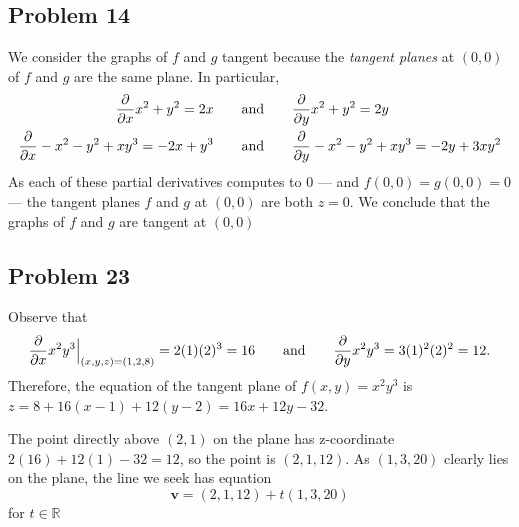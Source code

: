 \documentclass[11pt]{article}
\renewcommand{\vec}[1]{\mathbf{#1}}
\begin{document}

\subsection{Problem 14} 

We consider the graphs of $f$ and $g$ tangent because the \textit{tangent planes} at $(0, 0)$ of $f$ and $g$ are the same plane. In particular,
\begin{align*}
	\pdv{x} x^{2} + y^{2} = 2x \qquad & \text{and} \qquad  \pdv{y} x^{2} + y^{2} = 2y \\
	\pdv{x} -x^{2} - y^{2} + xy^{3} = -2x + y^{3} \qquad & \text{and} \qquad  \pdv{y} -x^{2} - y^{2} + xy^{3} = -2y + 3xy^{2}
\end{align*}
As each of these partial derivatives computes to $0$ --- and $f(0, 0) = g(0, 0) = 0$ --- the tangent planes $f$ and $g$ at $(0, 0)$ are both $z = 0$. We conclude that the graphs of $f$ and $g$ are tangent at $(0, 0)$


\subsection{Problem 23}

Observe that 
\[
	\pdv{x} x^{2}y^{3} \Big|_{(x, y, z) = (1, 2, 8)} = 2(1)(2)^{3} = 16 \qquad \text{and} \qquad \pdv{y} x^{2}y^{3} = 3(1)^{2}(2)^{2} = 12.
\]
Therefore, the equation of the tangent plane of $f(x, y) = x^{2} y^{3}$ is $z = 8 + 16(x - 1) + 12(y - 2) = 16x + 12y - 32$.

The point directly above $(2, 1)$ on the plane has z-coordinate $2(16) + 12(1) - 32 = 12$, so the point is $(2, 1, 12)$. As $(1, 3, 20)$ clearly lies on the plane, the line we seek has equation 
\[
	\vec{v} = (2, 1, 12) + t(1, 3, 20)
\]
for $t \in \mathbb{R}$

\end{document}
